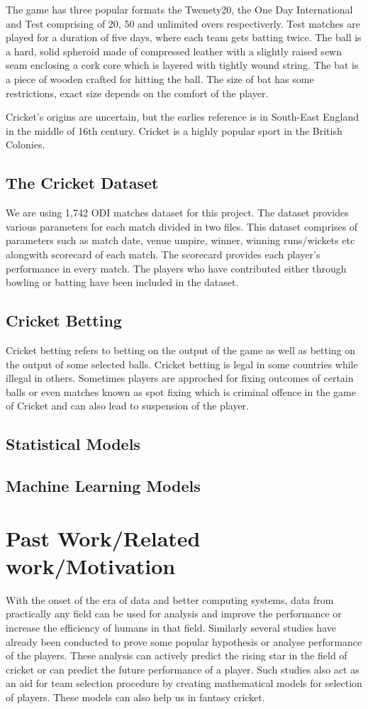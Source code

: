 \documentclass[fleqn,10pt]{wlscirep}
\begin{document}
The game has three popular formats the Twenety20, the One Day International and Test comprising of 20, 50 and unlimited overs respectiverly. Test matches are played for a
duration of five days, where each team gets batting twice.
The ball is a hard, solid spheroid made of compressed leather with a slightly raised sewn seam enclosing a cork core which is layered with tightly wound string. The bat is a
piece of wooden crafted for hitting the ball. The size of bat has some restrictions, exact size depends on the comfort of the player.

Cricket's origins are uncertain, but the earlies reference is in South-East England in the middle of 16th century. Cricket is a highly popular sport 
in the British Colonies.

\subsection{The Cricket Dataset}

We are using 1,742 ODI matches dataset for this project. The dataset provides various parameters for each match divided in two files.
This dataset comprises of parameters such as match date, venue umpire, winner, winning runs/wickets etc alongwith scorecard of each match.
The scorecard provides each player's performance in every match. The players who have contributed either through bowling or batting have been included in the dataset.

\subsection{Cricket Betting}
Cricket betting refers to betting on the output of the game as well as betting on the output of some selected balls.
Cricket betting is legal in some countries while illegal in others. Sometimes players are approched for fixing outcomes of certain balls 
or even matches known as spot fixing which is criminal offence in the game of Cricket and can also lead to suspension of the player.
\subsection{Statistical Models}
\subsection{Machine Learning Models}
\section{Past Work/Related work/Motivation}
With the onset of the era of data and better computing systems, data from practically any field can be used for analysis and 
improve the performance or increase the efficiency of humans in that field. Similarly several studies have already been conducted to prove some popular 
hypothesis or analyse performance of the players. These analysis can actively predict the rising star in the field of cricket or can predict the 
future performance of a player. Such studies also act as an aid for team selection procedure by creating mathematical models for selection of players.
These models can also help us in fantasy cricket.
\end{document}
